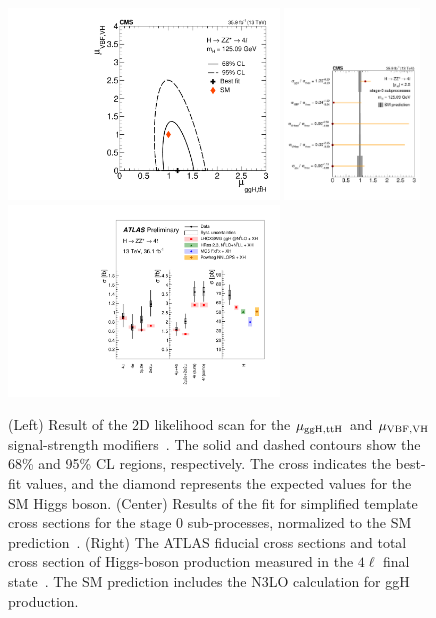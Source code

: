 \documentclass[10pt]{article}
\begin{document}
\begin{figure}[htb]
\centering
\includegraphics[height=2in]{figures/CMS-HIG-16-041_Figure_008-c.pdf}
\includegraphics[height=2in]{figures/CMS-HIG-16-041_Figure_009.pdf}
\includegraphics[height=2in]{figures/ATLAS-HIGG-2016-25__fig_07__xs.pdf}
\caption{
  (Left) Result of the 2D likelihood scan for the ${\rm \mu_{ggH,ttH}}$
  and ${\rm \mu_{VBF,VH}}$ signal-strength modifiers~\cite{Sirunyan:2017exp}.
  The solid and dashed
  contours show the 68\% and 95\% CL regions, respectively. The cross
  indicates the best-fit values, and the diamond represents the expected
  values for the SM Higgs boson.
  (Center) Results of the fit for simplified template cross sections for
  the stage 0 sub-processes, normalized to the SM prediction~\cite{Sirunyan:2017exp}.
  (Right) The ATLAS fiducial cross sections and total cross
  section of Higgs-boson production measured in the $4\ell$
  final state~\cite{Aaboud:2017oem}. The SM prediction includes the N3LO
  calculation for ggH production.
}
\label{fig:figure-ZZ-2}
\end{figure}
\end{document}
